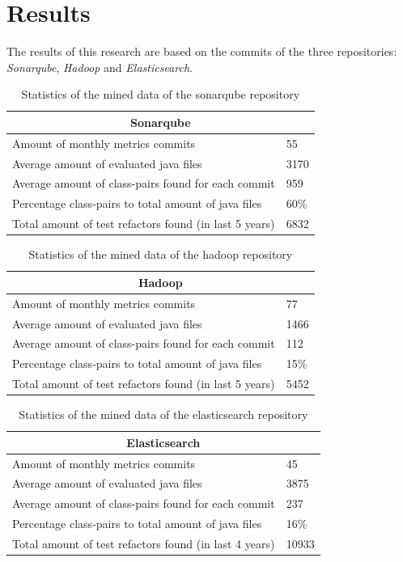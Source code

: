 \section{Results}
The results of this research are based on the commits of the three repositories: \textit{Sonarqube}, \textit{Hadoop} and \textit{Elasticsearch}.

\begin{table}[!ht]
\centering
\begin{tabular}{|l|l|}
\hline
\multicolumn{2}{|c|}{Sonarqube} \\ \hline
Amount of monthly metrics commits & 55  \\ \hline
Average amount of evaluated java files & 3170  \\ \hline
Average amount of class-pairs found for each commit & 959 \\ \hline
Percentage class-pairs to total amount of java files & 60\% \\ \hline
Total amount of test refactors found (in last 5 years) & 6832 \\ \hline
\end{tabular}
\caption{Statistics of the mined data of the sonarqube repository}
\label{table:6}
\end{table}

\begin{table}[!ht]
\centering
\begin{tabular}{|l|l|}
\hline
\multicolumn{2}{|c|}{Hadoop} \\ \hline
Amount of monthly metrics commits & 77 \\ \hline
Average amount of evaluated java files & 1466  \\ \hline
Average amount of class-pairs found for each commit & 112 \\ \hline
Percentage class-pairs to total amount of java files & 15\% \\ \hline
Total amount of test refactors found (in last 5 years) & 5452 \\ \hline
\end{tabular}
\caption{Statistics of the mined data of the hadoop repository}
\label{table:7}
\end{table}


\begin{table}[!ht]
\centering
\begin{tabular}{|l|l|}
\hline
\multicolumn{2}{|c|}{Elasticsearch} \\ \hline
Amount of monthly metrics commits & 45  \\ \hline
Average amount of evaluated java files & 3875  \\ \hline
Average amount of class-pairs found for each commit & 237 \\ \hline
Percentage class-pairs to total amount of java files & 16\% \\ \hline
Total amount of test refactors found (in last 4 years) & 10933 \\ \hline
\end{tabular}
\caption{Statistics of the mined data of the elasticsearch repository}
\label{table:8}
\end{table}

